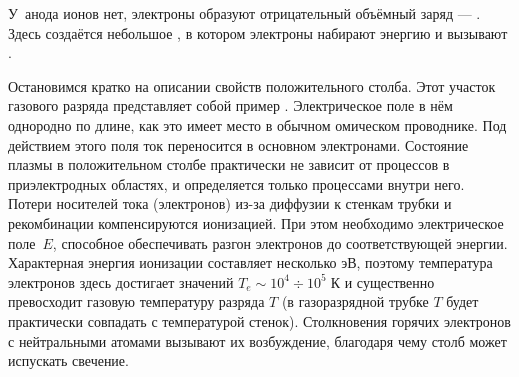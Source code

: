 \begin{labsupplement}[Газовый разряд]
%
%
%
%
%
%

У~анода ионов нет, электроны образуют отрицательный объёмный заряд 
--- . Здесь создаётся небольшое 
, в котором электроны
набирают энергию и вызывают .

Остановимся кратко на описании свойств положительного столба.
Этот участок газового разряда представляет собой пример
.
Электрическое поле в нём однородно по длине,
как это имеет место в обычном омическом проводнике.
Под действием этого поля ток переносится в основном электронами.
Состояние плазмы в положительном столбе практически не зависит от процессов в
приэлектродных областях, и определяется только процессами внутри него.
Потери носителей тока (электронов) из-за диффузии к стенкам трубки и рекомбинации
компенсируются ионизацией. При этом необходимо электрическое поле~$E$,
способное обеспечивать разгон электронов до соответствующей энергии.
Характерная энергия ионизации составляет несколько эВ,
поэтому температура электронов здесь достигает значений 
$T_e \sim 10^4 \div 10^5\;К$ и существенно превосходит газовую температуру 
разряда $T$ (в газоразрядной трубке $T$ будет практически совпадать 
с температурой стенок).
Столкновения горячих электронов с нейтральными атомами вызывают их возбуждение,
благодаря чему столб может испускать свечение.


\end{labsupplement}

